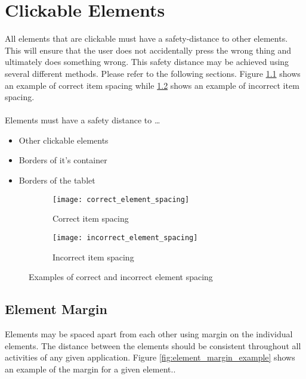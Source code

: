 
\chapter{Clickable Elements}
All elements that are clickable must have a safety-distance to other elements. This will ensure that the user does not accidentally press the wrong thing and ultimately does something wrong. This safety distance may be achieved using several different methods. Please refer to the following sections. Figure \ref{fig:correct_element_spacing} shows an example of correct item spacing while \ref{fig:incorrect_element_spacing} shows an example of incorrect item spacing.
\\\\
Elements must have a safety distance to \ldots
\begin{itemize}
	\item Other clickable elements
	\item Borders of it's container
	\item Borders of the tablet
\end{itemize}

\begin{figure}[!htbp]
    \centering

    \begin{subfigure}[t]{0.4\textwidth}
    	\centering
        \texttt{[image: correct\_element\_spacing]}
        \caption{Correct item spacing}
        \label{fig:correct_element_spacing}
    \end{subfigure}
    \hspace{5em} 
    \begin{subfigure}[t]{0.4\textwidth}
    	\centering
        \texttt{[image: incorrect\_element\_spacing]}
        \caption{Incorrect item spacing}
        \label{fig:incorrect_element_spacing}
    \end{subfigure}
    
    \caption{Examples of correct and incorrect element spacing}
    \label{fig:element_spacing_examples}
\end{figure}

\section{Element Margin}
Elements may be spaced apart from each other using margin on the individual elements. The distance between the elements should be consistent throughout all activities of any given application. Figure \ref{fig:element_margin_example} shows an example of the margin for a given element.. 

